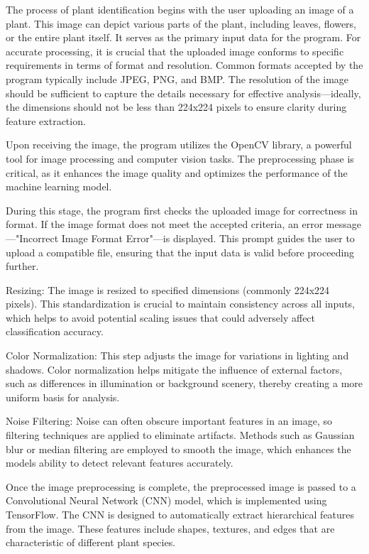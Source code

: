\documentclass[
]{article}
\begin{document}
The process of plant identification begins with the user uploading an
image of a plant. This image can depict various parts of the plant,
including leaves, flowers, or the entire plant itself. It serves as the
primary input data for the program. For accurate processing, it is
crucial that the uploaded image conforms to specific requirements in
terms of format and resolution. Common formats accepted by the program
typically include JPEG, PNG, and BMP. The resolution of the image should
be sufficient to capture the details necessary for effective
analysis---ideally, the dimensions should not be less than 224x224
pixels to ensure clarity during feature extraction.

Upon receiving the image, the program utilizes the OpenCV library, a
powerful tool for image processing and computer vision tasks. The
preprocessing phase is critical, as it enhances the image quality and
optimizes the performance of the machine learning model.

During this stage, the program first checks the uploaded image for
correctness in format. If the image format does not meet the accepted
criteria, an error message---"Incorrect Image Format Error"---is
displayed. This prompt guides the user to upload a compatible file,
ensuring that the input data is valid before proceeding further.

Resizing: The image is resized to specified dimensions (commonly 224x224
pixels). This standardization is crucial to maintain consistency across
all inputs, which helps to avoid potential scaling issues that could
adversely affect classification accuracy.

Color Normalization: This step adjusts the image for variations in
lighting and shadows. Color normalization helps mitigate the influence
of external factors, such as differences in illumination or background
scenery, thereby creating a more uniform basis for analysis.

Noise Filtering: Noise can often obscure important features in an image,
so filtering techniques are applied to eliminate artifacts. Methods such
as Gaussian blur or median filtering are employed to smooth the image,
which enhances the model\textquotesingle s ability to detect relevant
features accurately.

Once the image preprocessing is complete, the preprocessed image is
passed to a Convolutional Neural Network (CNN) model, which is
implemented using TensorFlow. The CNN is designed to automatically
extract hierarchical features from the image. These features include
shapes, textures, and edges that are characteristic of different plant
species.
\end{document}

